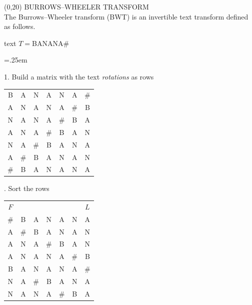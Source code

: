 \documentclass[a4paper]{article} %
\newcommand{\eos}{\#}
\begin{document}
\begin{textblock}{60}(0,20)
  {\sffamily\normalsize{\color{sciorange}BURROWS--WHEELER
      TRANSFORM}}\vspace{1mm}\\ %
  \footnotesize 
The Burrows--Wheeler transform (BWT) is an invertible text transform
defined as follows.\vspace{3mm}

{\scriptsize\sffamily
{} text $T={}$BANANA\eos
\vspace{2mm}

\tabcolsep=.25em
\quad\begin{minipage}[t]{26mm}
\raggedright
  1. Build a matrix with the text \emph{rotations} as rows
\begin{center}
\sffamily
    \begin{tabular}{ccccccc}
    B&A&N&A&N&A&\eos\\
    A&N&A&N&A&\eos&B\\
    N&A&N&A&\eos&B&A\\
    A&N&A&\eos&B&A&N\\
    N&A&\eos&B&A&N&A\\
    A&\eos&B&A&N&A&N\\
    \eos&B&A&N&A&N&A\\
  \end{tabular}
  \end{center}
\end{minipage}
\hfill
\begin{minipage}[t]{28mm}
. Sort the rows
\begin{center}
\sffamily
    \begin{tabular}{|c|ccccc|c|}
    \multicolumn{1}{c}{$F$} &&&&&\multicolumn{1}{c}{}& \multicolumn{1}{c}{$L$}\\
    \cline{1-1}\cline{7-7}
    \eos&B&A&N&A&N&A\\
    A&\eos&B&A&N&A&N\\
    A&N&A&\eos&B&A&N\\
    A&N&A&N&A&\eos&B\\
    B&A&N&A&N&A&\eos\\
    N&A&\eos&B&A&N&A\\
    N&A&N&A&\eos&B&A\\
    \cline{1-1}\cline{7-7}
  \end{tabular}
\end{center}
\end{minipage}
\vspace{2mm}

}
\end{textblock}
\end{document}
